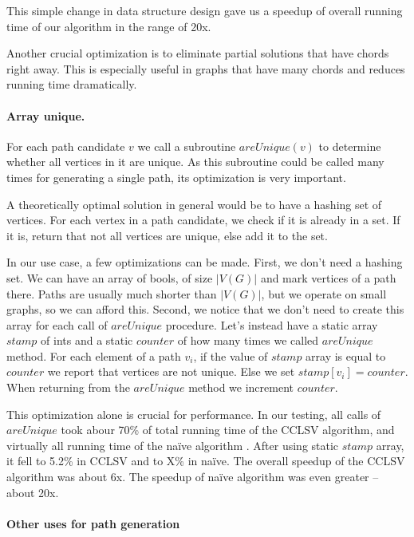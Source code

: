 This simple change in data structure design gave us a speedup of overall running time of our algorithm in the range of 20x.

Another crucial optimization is to eliminate partial solutions that have chords right away. This is especially useful in graphs that have many chords and reduces running time dramatically.

\paragraph{Array unique.}

For each path candidate $v$ we call a subroutine $areUnique(v)$ to determine whether all vertices in it are unique. As this subroutine could be called many times for generating a single path, its optimization is very important.

A theoretically optimal solution in general would be to have a hashing set of vertices. For each vertex in a path candidate, we check if it is already in a set. If it is, return that not all vertices are unique, else add it to the set.

In our use case, a few optimizations can be made. First, we don't need a hashing set. We can have an array of bools, of size $|V(G)|$ and mark vertices of a path there. Paths are usually much shorter than $|V(G)|$, but we operate on small graphs, so we can afford this. Second, we notice that we don't need to create this array for each call of $areUnique$ procedure. Let's instead have a static array $stamp$ of ints and a static $counter$ of how many times we called $areUnique$ method. For each element of a path $v_i$, if the value of $stamp$ array is equal to $counter$ we report that vertices are not unique. Else we set $stamp[v_i] = counter$. When returning from the $areUnique$ method we increment $counter$.

This optimization alone is crucial for performance. In our testing, all calls of $areUnique$ took abour 70\% of total running time of the CCLSV algorithm, and virtually all running time of the na\"ive algorithm . After using static $stamp$ array, it fell to 5.2\% in CCLSV and to X\% in na\"ive. The overall speedup of the CCLSV algorithm was about 6x.  The speedup of na\"ive algorithm was even greater -- about 20x.

\paragraph{Other uses for path generation}
\label{sec:usesGeneration}

